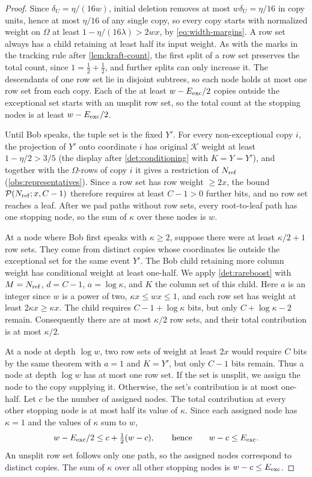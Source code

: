 \documentclass[11pt,letterpaper]{article} \usepackage[utf8]{inputenc}
\theoremstyle{plain} \newtheorem{theorem}{Theorem}[section]
\theoremstyle{definition} \newaliascnt{definition}{theorem}
\newcommand{\RP}[3]{\mathcal{P}(#1;#2,#3)}
\begin{document}
\begin{proof}
Since $\delta_U=\eta/(16w)$, initial deletion removes at most
$w\delta_U=\eta/16$ in copy units, hence at most $\eta/16$ of any
single copy, so every copy starts with normalized weight on $\Omega$ at least
$1-\eta/(16\lambda)>2wx$, by \eqref{eq:width-margins}. A row set always has a child retaining at
least half its input weight. As with the marks in the tracking rule after
\cref{lem:kraft-count}, the first split of a row set preserves the total count,
since $1=\frac12+\frac12$, and further splits can only increase it. The descendants
of one row set lie in disjoint subtrees, so each node holds at most one row set
from each copy. Each of the at least $w-E_{\rm exc}/2$ copies outside the
exceptional set starts with an unsplit row set, so the total count at the
stopping nodes is at least $w-E_{\rm exc}/2$.

Until Bob speaks, the tuple set is the fixed $Y'$. For every non-exceptional copy $i$,
the projection of $Y'$ onto coordinate $i$ has original $\mathcal K$ weight at least $1-\eta/2>3/5$
(the display after \cref{det:conditioning} with $K=Y=Y'$), and together with
the $\Omega$-rows of copy $i$ it gives a restriction of $N_{\rm ref}$
(\cref{obs:representatives}). Since a row set
has row weight $\ge2x$, the bound
$\RP{N_{\rm ref}}{x}{C-1}$ therefore requires at least $C-1>0$ further bits,
and no row set reaches a leaf.
After we pad paths without row sets, every root-to-leaf path has one
stopping node, so the sum of $\kappa$ over these nodes is $w$.

At a node where Bob first speaks with $\kappa\ge2$, suppose there were at
least $\kappa/2+1$ row sets. They come from distinct copies whose coordinates
lie outside the exceptional set for the same event $Y'$. The Bob child retaining more column weight has conditional weight at least one-half.
We apply \cref{det:rareboost} with $M=N_{\rm ref}$, $d=C-1$, $a=\log\kappa$,
and $K$ the column set of this child. Here $a$ is an integer since $w$ is
a power of two, $\kappa x\le wx\le1$, and
each row set has weight at least $2\kappa x\ge\kappa x$. The child requires
$C-1+\log\kappa$ bits, but only $C+\log\kappa-2$ remain.
Consequently there are at most $\kappa/2$ row sets, and their total
contribution is at most $\kappa/2$.

At a node at depth $\log w$, two row sets of weight at least $2x$ would require $C$ bits by the same theorem
with $a=1$ and $K=Y'$, but only $C-1$ bits remain.
Thus a node at depth $\log w$ has at most one row set. If the set is unsplit, we
assign the node to the copy supplying it. Otherwise, the set's
contribution is at most one-half. Let $c$ be the number of assigned nodes.
The total contribution at every other stopping node is at most half its value
of $\kappa$. Since each assigned node has $\kappa=1$ and the values of $\kappa$ sum to $w$,
\[
 w-E_{\rm exc}/2\le c+\tfrac12(w-c),\qquad\text{hence}\qquad w-c\le E_{\rm exc}.
\]
An unsplit row set follows only one path,
so the assigned nodes correspond to distinct copies. The sum of $\kappa$
over all other stopping nodes is $w-c\le E_{\rm exc}$.
\end{proof}
\end{document}
